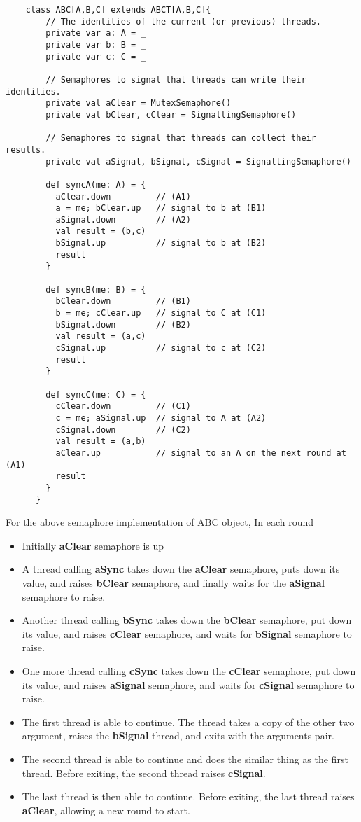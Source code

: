 \documentclass{article}
\begin{document}
\begin{verbatim}
    class ABC[A,B,C] extends ABCT[A,B,C]{
        // The identities of the current (or previous) threads.
        private var a: A = _
        private var b: B = _
        private var c: C = _
      
        // Semaphores to signal that threads can write their identities.
        private val aClear = MutexSemaphore()
        private val bClear, cClear = SignallingSemaphore()
      
        // Semaphores to signal that threads can collect their results. 
        private val aSignal, bSignal, cSignal = SignallingSemaphore()
      
        def syncA(me: A) = {
          aClear.down         // (A1)
          a = me; bClear.up   // signal to b at (B1)
          aSignal.down        // (A2)
          val result = (b,c)
          bSignal.up          // signal to b at (B2)
          result
        }
      
        def syncB(me: B) = {
          bClear.down         // (B1)
          b = me; cClear.up   // signal to C at (C1)
          bSignal.down        // (B2)
          val result = (a,c)
          cSignal.up          // signal to c at (C2)
          result
        }
      
        def syncC(me: C) = {
          cClear.down         // (C1)
          c = me; aSignal.up  // signal to A at (A2)
          cSignal.down        // (C2)
          val result = (a,b)
          aClear.up           // signal to an A on the next round at (A1)
          result
        }
      }      
\end{verbatim}

For the above semaphore implementation of ABC object, In each round
\begin{itemize}
    \item Initially \textbf{aClear} semaphore is up
    \item A thread calling \textbf{aSync} takes down the \textbf{aClear} semaphore, puts down its value, and raises \textbf{bClear} semaphore, and finally waits for the \textbf{aSignal} semaphore to raise.
    \item Another thread calling \textbf{bSync} takes down the \textbf{bClear} semaphore, put down its value, and raises \textbf{cClear} semaphore, and waits for \textbf{bSignal} semaphore to raise.
    \item One more thread calling \textbf{cSync} takes down the \textbf{cClear} semaphore, put down its value, and raises \textbf{aSignal} semaphore, and waits for \textbf{cSignal} semaphore to raise.
    \item The first thread is able to continue. The thread takes a copy of the other two argument, raises the \textbf{bSignal} thread, and exits with the arguments pair.
    \item The second thread is able to continue and does the similar thing as the first thread. Before exiting, the second thread raises \textbf{cSignal}.
    \item The last thread is then able to continue. Before exiting, the last thread raises \textbf{aClear}, allowing a new round to start.
\end{itemize}
\end{document}
